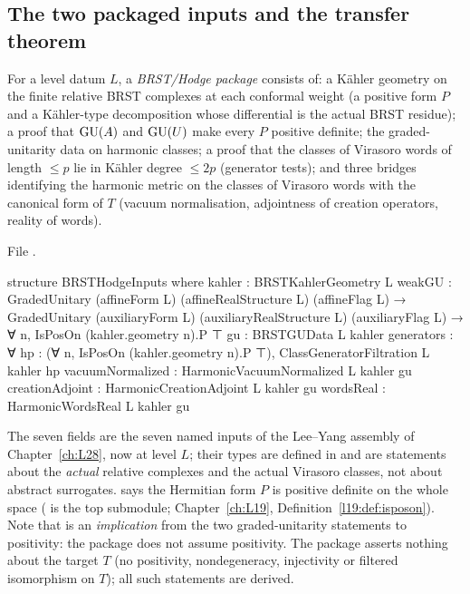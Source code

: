 \subsection{The two packaged inputs and the transfer theorem}

\begin{definition}\label{l29:def:hodge}
For a level datum $L$, a \emph{BRST/Hodge package} consists of: a Kähler geometry on the finite relative BRST
complexes at each conformal weight (a positive form $P$ and a Kähler-type decomposition whose differential is the
actual BRST residue); a proof that $\mathrm{GU}(A)$ and $\mathrm{GU}(U)$ make every $P$ positive definite; the
graded-unitarity data on harmonic classes; a proof that the classes of Virasoro words of length $\le p$ lie in Kähler
degree $\le 2p$ (generator tests); and three bridges identifying the harmonic metric on the classes of Virasoro words
with the canonical form of $T$ (vacuum normalisation, adjointness of creation operators, reality of words).
\end{definition}

\noindent File .
\begin{leancode}
structure BRSTHodgeInputs where
  kahler : BRSTKahlerGeometry L
  weakGU : GradedUnitary (affineForm L) (affineRealStructure L) (affineFlag L) →
    GradedUnitary (auxiliaryForm L) (auxiliaryRealStructure L) (auxiliaryFlag L) →
    ∀ n, IsPosOn (kahler.geometry n).P ⊤
  gu : BRSTGUData L kahler
  generators : ∀ hp : (∀ n, IsPosOn (kahler.geometry n).P ⊤),
    ClassGeneratorFiltration L kahler hp
  vacuumNormalized : HarmonicVacuumNormalized L kahler gu
  creationAdjoint : HarmonicCreationAdjoint L kahler gu
  wordsReal : HarmonicWordsReal L kahler gu
\end{leancode}

\begin{dictionary}
The seven fields are the seven named inputs of the Lee--Yang assembly of Chapter~\ref{ch:L28}, now at level $L$;
their types are defined in  and are statements about the \emph{actual} relative complexes
 and the actual Virasoro classes, not about abstract surrogates.  says
the Hermitian form $P$ is positive definite on the whole space ( is the top submodule; Chapter~\ref{ch:L19},
Definition~\ref{l19:def:isposon}). Note that  is an \emph{implication} from the two graded-unitarity
statements to positivity: the package does not assume positivity. The package asserts nothing about the target $T$
(no positivity, nondegeneracy, injectivity or filtered isomorphism on $T$); all such statements are derived.
\end{dictionary}

